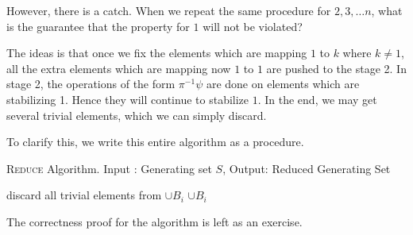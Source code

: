 However, there is a catch. When we repeat the same procedure for $2,3, \ldots n$, what is the guarantee that the property for $1$ will not be violated?

The ideas is that once we fix the elements which are mapping $1$ to $k$ where $k \ne 1$, all the extra elements which are mapping now $1$ to $1$ are pushed to the stage 2. In stage 2, the operations of the form $\pi^{-1} \psi$ are done on elements which are stabilizing 1. Hence they will continue to stabilize $1$. In the end, we may get several trivial elements, which we can simply discard.

To clarify this, we write this entire algorithm as a procedure.

\begin{algorithm}
\caption{\textsc{Reduce} Algorithm. Input : Generating set $S$, Output: Reduced Generating Set}
\begin{algorithmic}[1]
\Else
{}
\EndIf
\Else
{}
\EndIf
\EndFor
\EndFor
\State discard all trivial elements from $\cup B_i$
 $\cup B_i$
\end{algorithmic}
\end{algorithm}
The correctness proof for the algorithm is left as an exercise.
